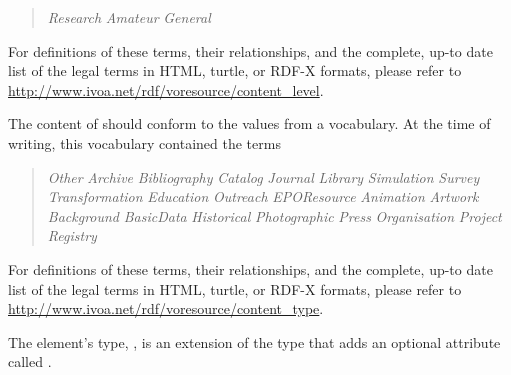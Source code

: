\documentclass[11pt,a4paper]{ivoa}
\begin{document}
\begin{quotation}\noindent
\textsl{Research}
\textsl{Amateur}
\textsl{General}

\end{quotation}

For definitions of these terms, their relationships, and the complete,
up-to date list of the legal terms in HTML, turtle, or RDF-X formats,
please refer to \url{http://www.ivoa.net/rdf/voresource/content_level}.

The content of  should conform to the values from a
vocabulary.  At the time of writing, this vocabulary contained the terms

\begin{quotation}\noindent
\textsl{Other}
\textsl{Archive}
\textsl{Bibliography}
\textsl{Catalog}
\textsl{Journal}
\textsl{Library}
\textsl{Simulation}
\textsl{Survey}
\textsl{Transformation}
\textsl{Education}
\textsl{Outreach}
\textsl{EPOResource}
\textsl{Animation}
\textsl{Artwork}
\textsl{Background}
\textsl{BasicData}
\textsl{Historical}
\textsl{Photographic}
\textsl{Press}
\textsl{Organisation}
\textsl{Project}
\textsl{Registry}

\end{quotation}

For definitions of these terms, their relationships, and the complete,
up-to date list of the legal terms in HTML, turtle, or RDF-X formats,
please refer to \url{http://www.ivoa.net/rdf/voresource/content_type}.


The  element's type,
, is an extension of the
 type that adds an optional attribute called
.  
\end{document}

